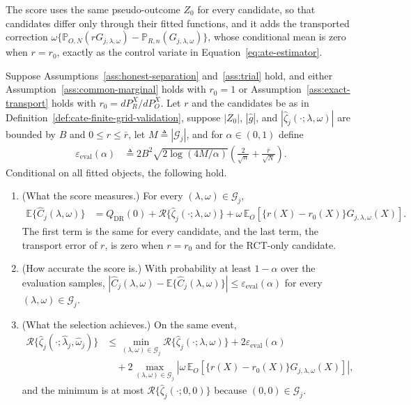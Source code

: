 The score uses the same pseudo-outcome $Z_0$ for every candidate, so that candidates differ only through their fitted functions, and it adds the transported correction $\omega\{\mathbb P_{O,N}(rG_{j,\lambda,\omega})-\mathbb P_{R,n}(G_{j,\lambda,\omega})\}$, whose conditional mean is zero when $r=r_0$, exactly as the control variate in Equation~\eqref{eq:ate-estimator}.

\begin{theorem}
\label{thm:cate-finite-validation}
Suppose Assumptions~\ref{ass:honest-separation} and~\ref{ass:trial} hold, and either Assumption~\ref{ass:common-marginal} holds with $r_0=1$ or Assumption~\ref{ass:exact-transport} holds with $r_0=dP_R^X/dP_O^X$. Let $r$ and the candidates be as in Definition~\ref{def:cate-finite-grid-validation}, suppose $|Z_0|$, $|\widehat g|$, and $|\widehat\zeta_j(\cdot;\lambda,\omega)|$ are bounded by $B$ and $0\leq r\leq\bar r$, let $M\triangleq|\mathcal G_j|$, and for $\alpha\in(0,1)$ define
\begin{align}
\varepsilon_{\mathrm{eval}}(\alpha)
&\triangleq2B^2\sqrt{2\log(4M/\alpha)}\left(\frac{2}{\sqrt n}+\frac{\bar r}{\sqrt N}\right).
\label{eq:eval-radius}
\end{align}
Conditional on all fitted objects, the following hold.
\begin{enumerate}
\item (What the score measures.) For every $(\lambda,\omega)\in\mathcal G_j$,
\begin{align}
\mathbb E\{\widehat C_j(\lambda,\omega)\}
&=Q_{\mathrm{DR}}(0)+\mathcal R\{\widehat\zeta_j(\cdot;\lambda,\omega)\}+\omega\,\mathbb E_O[\{r(X)-r_0(X)\}G_{j,\lambda,\omega}(X)].
\label{eq:common-reference-identity}
\end{align}
The first term is the same for every candidate, and the last term, the transport error of $r$, is zero when $r=r_0$ and for the RCT-only candidate.
\item (How accurate the score is.) With probability at least $1-\alpha$ over the evaluation samples, $|\widehat C_j(\lambda,\omega)-\mathbb E\{\widehat C_j(\lambda,\omega)\}|\leq\varepsilon_{\mathrm{eval}}(\alpha)$ for every $(\lambda,\omega)\in\mathcal G_j$.
\item (What the selection achieves.) On the same event,
\begin{align}
\mathcal R\{\widehat\zeta_j(\cdot;\widehat\lambda_j,\widehat\omega_j)\}
&\leq\min_{(\lambda,\omega)\in\mathcal G_j}\mathcal R\{\widehat\zeta_j(\cdot;\lambda,\omega)\}+2\varepsilon_{\mathrm{eval}}(\alpha)\nonumber\\
&\quad+2\max_{(\lambda,\omega)\in\mathcal G_j}\left|\omega\,\mathbb E_O[\{r(X)-r_0(X)\}G_{j,\lambda,\omega}(X)]\right|,
\label{eq:cate-selector-inequality}
\end{align}
and the minimum is at most $\mathcal R\{\widehat\zeta_j(\cdot;0,0)\}$ because $(0,0)\in\mathcal G_j$.
\end{enumerate}
\end{theorem}
